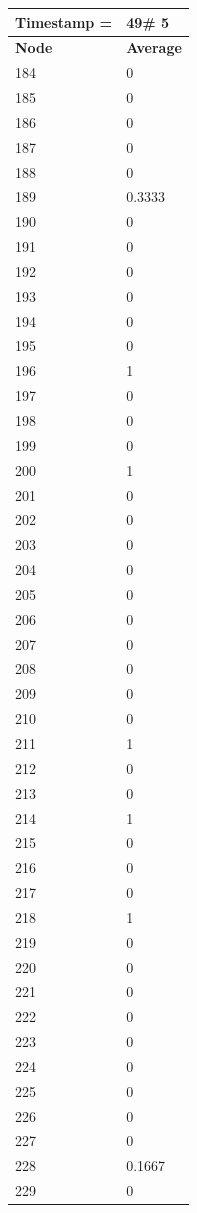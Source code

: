 \begin{tabular}{|l||l|}
\hline
\textbf{Timestamp =} & \textbf{49}\# 5\\\hline
	\textbf{Node} & \textbf{Average} \\ \hline
\hline
	184 & 0 \\ \hline
	185 & 0 \\ \hline
	186 & 0 \\ \hline
	187 & 0 \\ \hline
	188 & 0 \\ \hline
	189 & 0.3333 \\ \hline
	190 & 0 \\ \hline
	191 & 0 \\ \hline
	192 & 0 \\ \hline
	193 & 0 \\ \hline
	194 & 0 \\ \hline
	195 & 0 \\ \hline
	196 & 1 \\ \hline
	197 & 0 \\ \hline
	198 & 0 \\ \hline
	199 & 0 \\ \hline
	200 & 1 \\ \hline
	201 & 0 \\ \hline
	202 & 0 \\ \hline
	203 & 0 \\ \hline
	204 & 0 \\ \hline
	205 & 0 \\ \hline
	206 & 0 \\ \hline
	207 & 0 \\ \hline
	208 & 0 \\ \hline
	209 & 0 \\ \hline
	210 & 0 \\ \hline
	211 & 1 \\ \hline
	212 & 0 \\ \hline
	213 & 0 \\ \hline
	214 & 1 \\ \hline
	215 & 0 \\ \hline
	216 & 0 \\ \hline
	217 & 0 \\ \hline
	218 & 1 \\ \hline
	219 & 0 \\ \hline
	220 & 0 \\ \hline
	221 & 0 \\ \hline
	222 & 0 \\ \hline
	223 & 0 \\ \hline
	224 & 0 \\ \hline
	225 & 0 \\ \hline
	226 & 0 \\ \hline
	227 & 0 \\ \hline
	228 & 0.1667 \\ \hline
	229 & 0 \\ \hline
\end{tabular}

